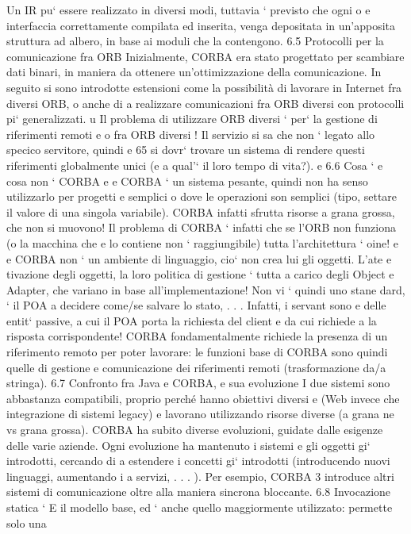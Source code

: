 \documentclass[a4paper,12pt]{article}
\begin{document}
Un IR pu` essere realizzato in diversi modi, tuttavia ` previsto che ogni
o
e
interfaccia correttamente compilata ed inserita, venga depositata in un'apposita
struttura ad albero, in base ai moduli che la contengono.
6.5
Protocolli per la comunicazione fra ORB
Inizialmente, CORBA era stato progettato per scambiare dati binari, in maniera
da ottenere un'ottimizzazione della comunicazione. In seguito si sono introdotte
estensioni come la possibilità di lavorare in Internet fra diversi ORB, o anche di
a
realizzare comunicazioni fra ORB diversi con protocolli pi` generalizzati.
u
Il problema di utilizzare ORB diversi ` per` la gestione di riferimenti remoti
e
o
fra ORB diversi ! Il servizio si sa che non ` legato allo specico servitore, quindi
e
65
\newpage
si dovr` trovare un sistema di rendere questi riferimenti globalmente unici (e
a
qual'` il loro tempo di vita?).
e
6.6
Cosa ` e cosa non ` CORBA
e
e
CORBA ` un sistema pesante, quindi non ha senso utilizzarlo per progetti
e
semplici o dove le operazioni son semplici (tipo, settare il valore di una singola
variabile). CORBA infatti sfrutta risorse a grana grossa, che non si muovono!
Il problema di CORBA ` infatti che se l'ORB non funziona (o la macchina che
e
lo contiene non ` raggiungibile) tutta l'architettura ` oine!
e
e
CORBA non ` un ambiente di linguaggio, cio` non crea lui gli oggetti. L'ate
e
tivazione degli oggetti, la loro politica di gestione ` tutta a carico degli Object
e
Adapter, che variano in base all'implementazione! Non vi ` quindi uno stane
dard, ` il POA a decidere come/se salvare lo stato, . . . Infatti, i servant sono
e
delle entit` passive, a cui il POA porta la richiesta del client e da cui richiede
a
la risposta corrispondente!
CORBA fondamentalmente richiede la presenza di un riferimento remoto
per poter lavorare: le funzioni base di CORBA sono quindi quelle di gestione e
comunicazione dei riferimenti remoti (trasformazione da/a stringa).
6.7
Confronto fra Java e CORBA, e sua evoluzione
I due sistemi sono abbastanza compatibili, proprio perché hanno obiettivi diversi
e
(Web invece che integrazione di sistemi legacy) e lavorano utilizzando risorse
diverse (a grana ne vs grana grossa).
CORBA ha subito diverse evoluzioni, guidate dalle esigenze delle varie aziende.
Ogni evoluzione ha mantenuto i sistemi e gli oggetti gi` introdotti, cercando di
a
estendere i concetti gi` introdotti (introducendo nuovi linguaggi, aumentando i
a
servizi, . . . ). Per esempio, CORBA 3 introduce altri sistemi di comunicazione
oltre alla maniera sincrona bloccante.
6.8
Invocazione statica
`
E il modello base, ed ` anche quello maggiormente utilizzato: permette solo una
\end{document}
